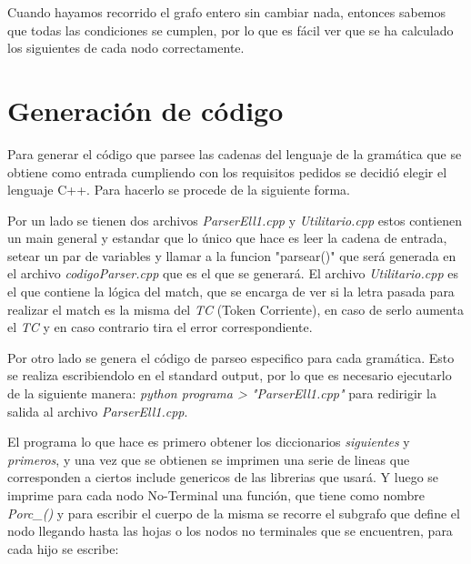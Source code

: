 \documentclass[a4paper]{report}
\begin{document}
	Cuando hayamos recorrido el grafo entero sin cambiar nada, entonces
sabemos que todas las condiciones se cumplen, por lo que es fácil ver que se ha
calculado los siguientes de cada nodo correctamente.


\section*{Generación de código}


Para generar el código que parsee las cadenas del lenguaje de la gramática que se 
obtiene como entrada cumpliendo con los requisitos pedidos se decidió elegir el lenguaje C++. Para hacerlo se procede de la siguiente forma.


Por un lado se tienen dos archivos \emph{ParserEll1.cpp} y \emph{Utilitario.cpp} estos contienen un main general y estandar
que lo único que hace es leer la cadena de entrada, setear un par de variables y llamar a la funcion "parsear()" 
que será generada en el archivo \emph{codigoParser.cpp} que es el que se generará. El archivo \emph{Utilitario.cpp} 
es el que contiene la lógica del match, que se encarga de ver si la letra pasada para realizar el match es la misma del \emph{TC} 
(Token Corriente), en caso de serlo aumenta el \emph{TC} y en caso contrario tira el error correspondiente.


Por otro lado se genera el código de parseo especifico para cada gramática. Esto se realiza escribiendolo en el standard output, 
por lo que es necesario ejecutarlo de la siguiente manera: \emph{python programa > "ParserEll1.cpp"} para redirigir la salida al archivo \emph{ParserEll1.cpp}.


El programa lo que hace es primero obtener los diccionarios \emph{siguientes} y \emph{primeros}, y una vez que se obtienen se imprimen una serie de lineas que corresponden a ciertos include genericos de las librerias que usará. Y luego se imprime para cada nodo No-Terminal una función, que tiene como nombre \emph{Porc\_<Nombre Nodo>()} y para escribir el cuerpo de la misma se recorre el subgrafo que define el nodo llegando hasta las hojas o los nodos no terminales que se encuentren, para cada hijo se escribe:
\end{document}
